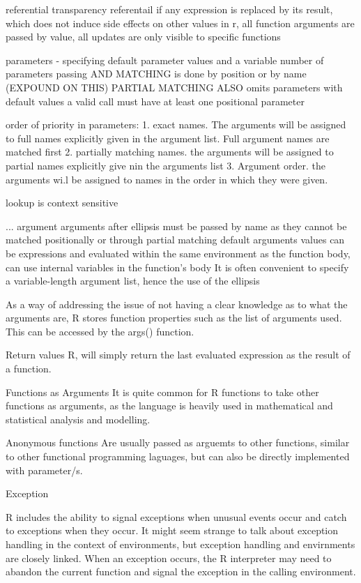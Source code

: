 \documentclass[12pt]{article}
\begin{document}
referential transparency
referentail if any expression is replaced by its result, which does not induce side effects on other values
in r, all function arguments are passed by value, all updates are only visible to specific functions

parameters - specifying default parameter values and a variable number of parameters
passing AND MATCHING is done by position or by name (EXPOUND ON THIS)
PARTIAL MATCHING ALSO
omits parameters with default values
a valid call must have at least one positional parameter

order of priority in parameters:
1. exact names. The arguments will be assigned to full names explicitly given in the argument list. Full argument names are matched first
2. partially matching names. the arguments will be assigned to partial names explicitly give nin the arguments list
3. Argument order. the arguments wi.l be assigned to names in the order in which they were given.


lookup is context sensitive

... argument
arguments after ellipsis must be passed by name as they cannot be matched positionally or through partial matching
default arguments values can be expressions and evaluated within the same environment as the function body, can use internal variables in the function's body
It is often convenient to specify a variable-length argument list, hence the use of the ellipsis

As a way of addressing the issue of not having a clear knowledge as to what the arguments are, R stores function properties such as the list of arguments used. This can be accessed by the args() function.

Return values
R, will simply return the last evaluated expression as the result of a function.

Functions as Arguments
It is quite common for R functions to take other functions as arguments, as the language is heavily used in mathematical and statistical analysis and modelling.

Anonymous functions
Are usually passed as arguemts to other functions, similar to other functional programming laguages, but can also be directly implemented with parameter/s.




Exception

R includes the ability to signal exceptions when unusual events occur and catch to exceptions when they occur. It might seem strange to talk about exception handling in the context of environments, but exception handling and envirnments are closely linked. When an exception occurs, the R interpreter may need to abandon the current function and signal the exception in the calling environment.
\end{document}
